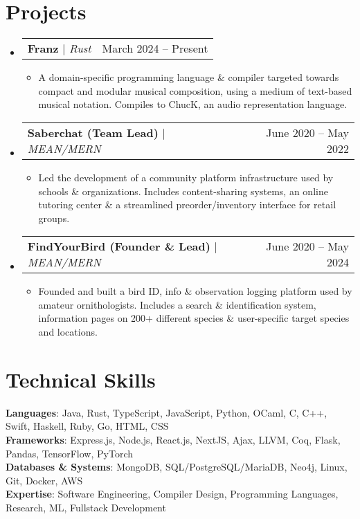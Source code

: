\documentclass[letterpaper,11pt]{article}
\makeatletter
\newcommand{\resumeItem}[1]{
  \item\small{
    {#1 \vspace{-2pt}}
  }
}
\newcommand{\resumeProjectHeading}[2]{
    \item
    \begin{tabular*}{0.97\textwidth}{l@{\extracolsep{\fill}}r}
      \small#1 & #2 \\
    \end{tabular*}\vspace{-7pt}
}
\newcommand{\resumeSubHeadingListStart}{\begin{itemize}[leftmargin=0.15in, label={}]}
\newcommand{\resumeSubHeadingListEnd}{\end{itemize}}
\newcommand{\resumeItemListStart}{\begin{itemize}}
\newcommand{\resumeItemListEnd}{\end{itemize}\vspace{-5pt}}
\makeatother
\begin{document}
\section{Projects}
    \resumeSubHeadingListStart
      \resumeProjectHeading
          {\textbf{Franz} $|$ \emph{Rust}}{March 2024 -- Present}
          \resumeItemListStart
            \resumeItem{A domain-specific programming language \& compiler targeted towards compact and modular musical composition, using a medium of text-based musical notation. Compiles to ChucK, an audio representation language.\\[-2pt]}
          \resumeItemListEnd
      \resumeProjectHeading
          {\textbf{Saberchat (Team Lead)} $|$ \emph{MEAN/MERN}}{June 2020 -- May 2022}
          \resumeItemListStart
            \resumeItem{Led the development of a community platform infrastructure used by schools \& organizations. Includes content-sharing systems, an online tutoring center \& a streamlined preorder/inventory interface for retail groups.\\[-1pt]}
          \resumeItemListEnd
      \resumeProjectHeading
          {\textbf{FindYourBird (Founder \& Lead)} $|$ \emph{MEAN/MERN}}{June 2020 -- May 2024}
          \resumeItemListStart
            \resumeItem{Founded and built a bird ID, info \& observation logging platform used by amateur ornithologists. Includes a search \& identification system, information pages on 200+ different species \& user-specific target species and locations.\\[-2pt]}
          \resumeItemListEnd
    \resumeSubHeadingListEnd
%
\section{Technical Skills}
 \begin{itemize}[leftmargin=0.15in, label={}]
    \small{\item{
     \textbf{Languages}{: Java, Rust, TypeScript, JavaScript, Python, OCaml, C, C++, Swift, Haskell, Ruby, Go, HTML, CSS} \\
     \textbf{Frameworks}{: Express.js, Node.js, React.js, NextJS, Ajax, LLVM, Coq, Flask, Pandas, TensorFlow, PyTorch} \\
     \textbf{Databases \& Systems}{: MongoDB, SQL/PostgreSQL/MariaDB, Neo4j, Linux, Git, Docker, AWS}\\
     \textbf{Expertise}{: Software Engineering, Compiler Design, Programming Languages, Research, ML, Fullstack Development} \\
    }}
 \end{itemize}


\end{document}
